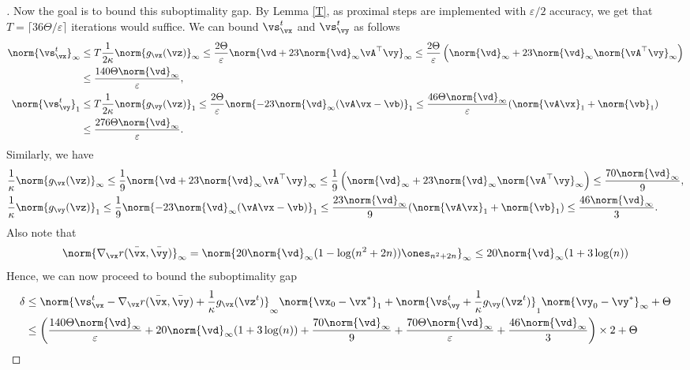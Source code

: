 \begin{proof} [\unskip\nopunct]
    Now the goal is to bound this suboptimality gap. By Lemma \ref{T}, as proximal steps are implemented with $\varepsilon/2$ accuracy, we get that $T = \lceil 36 \Theta / \varepsilon \rceil$ iterations would suffice. We can bound $\vs_\vx^t$ and $\vs_\vy^t$ as follows
    \begin{align*}
        \norm{\vs_\vx^t}_\infty &\leq T \frac{1}{2\kappa}  \norm{g_\vx(\vz)}_\infty \leq \frac{2 \Theta}{\varepsilon} \norm{\vd + 23 \norm{\vd}_\infty \vA^\top \vy}_\infty \leq \frac{2 \Theta}{\varepsilon} \left(\norm{\vd}_\infty + 23 \norm{\vd}_\infty \norm{\vA^\top \vy}_\infty \right) \\
        &\leq \frac{140 \Theta \norm{\vd}_\infty}{\varepsilon}, \\
        \norm{\vs_\vy^t}_1 &\leq T \frac{1}{2\kappa} \norm{g_\vy(\vz)}_1 \leq \frac{2 \Theta}{\varepsilon} \norm{-23 \norm{\vd}_\infty (\vA \vx -\vb)}_1 \leq \frac{46 \Theta \norm{\vd}_\infty}{\varepsilon} (\norm{\vA \vx}_1 + \norm{\vb}_1) \\
        &\leq \frac{276 \Theta \norm{\vd}_\infty}{\varepsilon}.
    \end{align*}
    Similarly, we have 
    \begin{align*}
        &\frac{1}{\kappa}  \norm{g_\vx(\vz)}_\infty \leq \frac{1 }{9} \norm{\vd + 23 \norm{\vd}_\infty \vA^\top \vy}_\infty \leq \frac{1}{9} \left(\norm{\vd}_\infty + 23 \norm{\vd}_\infty \norm{\vA^\top \vy}_\infty \right) \leq \frac{70 \norm{\vd}_\infty}{9}, \\
        &\frac{1}{\kappa} \norm{g_\vy(\vz)}_1 \leq \frac{1}{9} \norm{-23 \norm{\vd}_\infty (\vA \vx -\vb)}_1 \leq \frac{23 \norm{\vd}_\infty}{9} (\norm{\vA \vx}_1 + \norm{\vb}_1) \leq \frac{46 \norm{\vd}_\infty}{3}.
    \end{align*}
    Also note that 
    \begin{align*}
        \norm{\nabla_\vx r(\bar{\vx}, \bar{\vy})}_\infty = \norm{20 \norm{
        \vd}_\infty (1 - \log(n^2+2n)) \ones_{n^2 +2n}}_\infty \leq 20 \norm{
        \vd}_\infty (1 + 3\log(n))
    \end{align*}
    Hence, we can now proceed to bound the suboptimality gap
    \begin{align*}
        \delta &\leq \norm{\vs^t_\vx -\nabla_\vx r(\bar{\vx}, \bar{\vy}) + \frac{1}{\kappa} g_\vx(\vz^t)}_\infty \norm{\vx_0-\vx^\ast}_1 + \norm{\vs^t_\vy + \frac{1}{\kappa} g_\vy(\vz^t)}_1 \norm{\vy_0-\vy^\ast}_\infty + \Theta \\
        &\leq \left(\frac{140 \Theta \norm{\vd}_\infty}{\varepsilon} + 20 \norm{\vd}_\infty (1 + 3\log(n)) + \frac{70 \norm{\vd}_\infty}{9} + \frac{70 \Theta \norm{\vd}_\infty}{\varepsilon} + \frac{46 \norm{\vd}_\infty}{3} \right) \times 2 + \Theta \\

\end{align*}
\end{proof}
